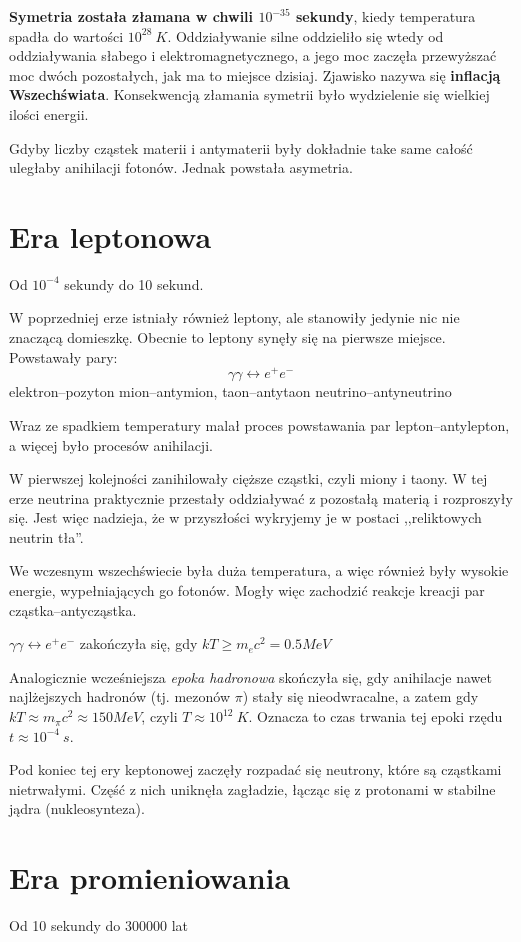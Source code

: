 \documentclass [a4paper, 11pt, oneside]{book}
\begin{document}
	\textbf{Symetria została złamana w chwili $10^{-35}$ sekundy}, kiedy temperatura spadła do wartości $10^{28}~K$. Oddziaływanie silne oddzieliło się wtedy od oddziaływania słabego i elektromagnetycznego, a jego moc zaczęła przewyższać moc dwóch pozostałych, jak ma to miejsce dzisiaj. Zjawisko nazywa się \textbf{inflacją Wszechświata}. Konsekwencją złamania symetrii było wydzielenie się wielkiej ilości energii.

	Gdyby liczby cząstek materii i antymaterii były dokładnie take same całość uległaby anihilacji fotonów. Jednak powstała asymetria. 

	\section{Era leptonowa}
	Od $10^{-4}$ sekundy do 10 sekund.

	W poprzedniej erze istniały również leptony, ale stanowiły jedynie nic nie znaczącą domieszkę. Obecnie to leptony synęły się na pierwsze miejsce. Powstawały pary:
	$$\gamma\gamma \leftrightarrow e^+ e^-$$
	elektron--pozyton mion--antymion, taon--antytaon neutrino--antyneutrino

	Wraz ze spadkiem temperatury malał proces powstawania par lepton--antylepton, a więcej było procesów anihilacji.

	W pierwszej kolejności zanihilowały cięższe cząstki, czyli miony i taony. W tej erze neutrina praktycznie przestały oddziaływać z pozostałą materią i rozproszyły się. Jest więc nadzieja, że w przyszłości wykryjemy je w postaci ,,reliktowych neutrin tła''.

	We wczesnym wszechświecie była duża temperatura, a więc również były wysokie energie, wypełniających go fotonów. Mogły więc zachodzić reakcje kreacji par cząstka--antycząstka.

	$\gamma\gamma \leftrightarrow e^+ e^-$ zakończyła się, gdy $kT \ge m_e c^2 = 0.5MeV$

	Analogicznie wcześniejsza \textit{epoka hadronowa} skończyła się, gdy anihilacje nawet najlżejszych hadronów (tj. mezonów $\pi$) stały się nieodwracalne, a zatem gdy $kT \approx m_\pi c^2\approx150MeV$, czyli $T\approx10^{12}~K$. Oznacza to czas trwania tej epoki rzędu $t\approx 10^{-4}~s$.

	Pod koniec tej ery keptonowej zaczęły rozpadać się neutrony, które są cząstkami nietrwałymi. Część z nich uniknęła zagładzie, łącząc się z protonami w stabilne jądra (nukleosynteza).

	\section{Era promieniowania}
	Od 10 sekundy do 300000 lat
\end{document}
